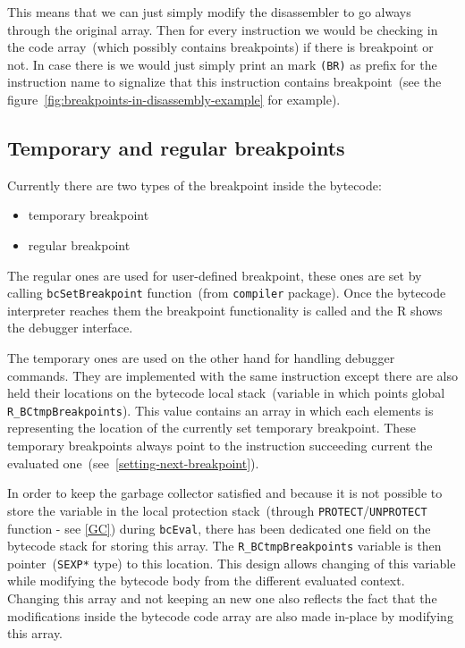 \documentclass[thesis=M,english]{FITthesis}[2018/10/20]
\newcommand{\code}[1]{\texttt{#1}}
\begin{document}
This means that we can just simply modify the disassembler to go always through the original array. Then for every instruction we would be checking in the code array~(which possibly contains breakpoints) if there is breakpoint or not. In case there is we would just simply print an mark \code{(BR)} as prefix for the instruction name to signalize that this instruction contains breakpoint~(see the figure~\ref{fig:breakpoints-in-disassembly-example} for example).

\subsection{Temporary and regular breakpoints}\label{temporary-and-regular-breakpoints}

Currently there are two types of the breakpoint inside the bytecode:

\begin{itemize}
	\item temporary breakpoint
	\item regular breakpoint
\end{itemize}

The regular ones are used for user-defined breakpoint, these ones are set by calling \code{bcSetBreakpoint} function~(from \code{compiler} package). Once the bytecode interpreter reaches them the breakpoint functionality is called and the R shows the debugger interface.

The temporary ones are used on the other hand for handling debugger commands. They are implemented with the same instruction except there are also held their locations on the bytecode local stack~(variable in which points global \code{R{\_}BCtmpBreakpoints}). This value contains an array in which each elements is representing the location of the currently set temporary breakpoint. These temporary breakpoints always point to the instruction succeeding current the evaluated one~(see~\ref{setting-next-breakpoint}).

In order to keep the garbage collector satisfied and because it is not possible to store the variable in the local protection stack~(through \code{PROTECT}/\code{UNPROTECT} function - see \ref{GC}) during \code{bcEval}, there has been dedicated one field on the bytecode stack for storing this array. The \code{R{\_}BCtmpBreakpoints} variable is then pointer~(\code{SEXP*} type) to this location. This design allows changing of this variable while modifying the bytecode body from the different evaluated context. Changing this array and not keeping an new one also reflects the fact that the modifications inside the bytecode code array are also made in-place by modifying this array.
\end{document}
